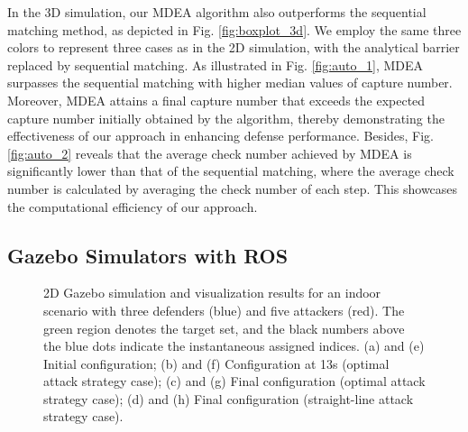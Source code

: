 \documentclass[journal]{IEEEtran}
\newcommand{\1}{\mathbf{1}}
\begin{document}
In the 3D simulation, our MDEA algorithm also outperforms the sequential matching method, as depicted in Fig. \ref{fig:boxplot_3d}. We employ the same three colors to represent three cases as in the 2D simulation, with the analytical barrier replaced by sequential matching. As illustrated in Fig. \ref{fig:auto_1}, MDEA surpasses the sequential matching with higher median values of capture number. Moreover, MDEA attains a final capture number that exceeds the expected capture number initially obtained by the algorithm, thereby demonstrating the effectiveness of our approach in enhancing defense performance. Besides, Fig. \ref{fig:auto_2} reveals that the average check number achieved by MDEA is significantly lower than that of the sequential matching, where the average check number is calculated by averaging the check number of each step. This showcases the computational efficiency of our approach.

\subsection{Gazebo Simulators with ROS}

\begin{figure*}[tp!]
	\centering
	\caption{\footnotesize 2D Gazebo simulation and visualization results for an indoor scenario with three defenders (blue) and five attackers (red). The green region denotes the target set, and the black numbers above the blue dots indicate the instantaneous assigned indices. (a) and (e) Initial configuration; (b) and (f) Configuration at 13s (optimal attack strategy case); (c) and (g) Final configuration (optimal attack strategy case); (d) and (h) Final configuration (straight-line attack strategy case).}
	\label{fig:2d}
	\vspace{-5px}
\end{figure*}
\end{document}
